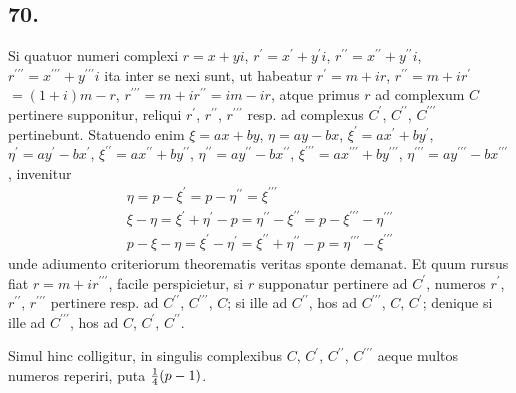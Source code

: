 \documentclass[twoside,12pt]{memoir}
\let\oldfrac\frac
\def\frac#1#2{\mathchoice{\tfrac{#1}{#2}}{\oldfrac{#1}{#2}}{\genfrac{}{}{}{2}{#1}{#2\mathstrut}}{\genfrac{}{}{}{3}{#1}{#2\mathstrut}}}
\begin{document}
\subsection*{70.}
 
Si quatuor numeri complexi \(r=x+y i\), \(r^{\prime}=x^{\prime}+y^{\prime} i\), \( r^{\prime \prime}=x^{\prime \prime}+y^{\prime \prime} i\), \(r^{\prime \prime \prime}=x^{\prime \prime \prime}+y^{\prime \prime \prime} i\) ita inter se nexi sunt, ut habeatur \(r^{\prime}=m+i r\), \( r^{\prime \prime}=m+i r^{\prime}\) \(=(1+i) m-r\), \( r^{\prime \prime \prime}=m+i r^{\prime \prime}=i m-i r\), atque primus \(r\) ad complexum \(C\) pertinere supponitur, reliqui \(r^{\prime}\), \( r^{\prime \prime}\), \( r^{\prime \prime \prime}\) resp. ad complexus \(C^{\prime}\), \( C^{\prime \prime}\), \( C^{\prime \prime \prime}\) pertinebunt. Statuendo enim \(\xi=a x+b y\), \( \eta=a y-b x\), \( \xi^{\prime}=a x^{\prime}+b y^{\prime}\), \( \eta^{\prime}=a y^{\prime}-b x^{\prime}\), \(\xi^{\prime \prime}=a x^{\prime \prime}+b y^{\prime \prime}\), \( \eta^{\prime \prime}=a y^{\prime \prime}-b x^{\prime \prime}\), \( \xi^{\prime \prime \prime}=a x^{\prime \prime \prime}+b y^{\prime \prime \prime}\), \( \eta^{\prime \prime \prime}=a y^{\prime \prime \prime}-b x^{\prime \prime \prime}\), invenitur
\[\begin{gathered}
\eta=p-\xi^{\prime}=p-\eta^{\prime \prime}=\xi^{\prime \prime \prime} \\
\xi-\eta=\xi^{\prime}+\eta^{\prime}-p=\eta^{\prime \prime}-\xi^{\prime \prime}=p-\xi^{\prime \prime \prime}-\eta^{\prime \prime \prime} \\
p-\xi-\eta=\xi^{\prime}-\eta^{\prime}=\xi^{\prime \prime}+\eta^{\prime \prime}-p=\eta^{\prime \prime \prime}-\xi^{\prime \prime \prime}
\end{gathered}\]
unde adiumento criteriorum theorematis veritas sponte demanat. Et quum rursus fiat \(r=m+i r^{\prime \prime \prime}\), facile perspicietur, si \(r\) supponatur pertinere ad \(C^{\prime}\), numeros \(r^{\prime}\), \( r^{\prime \prime}\), \( r^{\prime \prime \prime}\) pertinere resp. ad \(C^{\prime \prime}\), \( C^{\prime \prime \prime}\), \( C\); si ille ad \(C^{\prime \prime}\), hos ad \(C^{\prime \prime \prime}\), \( C\), \( C^{\prime}\); denique si ille ad \(C^{\prime \prime \prime}\), hos ad \(C\), \( C^{\prime}\), \( C^{\prime \prime}\).
 
Simul hinc colligitur, in singulis complexibus \(C\), \( C^{\prime}\), \( C^{\prime \prime}\), \( C^{\prime \prime \prime}\) aeque multos numeros reperiri, puta \(\frac{1}{4}(p-1)\).
\end{document}
